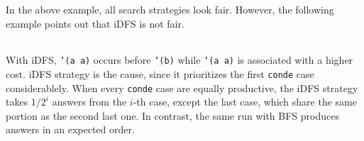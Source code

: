 \documentclass[format=acmlarge, review=true, authordraft=true]{acmart}
\begin{document}

In the above example, all search strategies look fair. However, the following 
example points out that iDFS is not fair.

\begin{center}
  \begin{tabular}{c}
   
   \end{tabular}
\end{center}

With iDFS, \texttt{'(a a)} occurs before \texttt{'(b)} while \texttt{'(a a)} is 
associated with a higher cost. iDFS strategy is the cause, since it prioritizes 
the first \texttt{conde} case considerablely. When every \texttt{conde} case 
are equally productive, the iDFS strategy takes $1/2^{i}$ answers from the 
$i$-th case, except the last case, which share the same portion as the second 
last one. In contrast, the same run with BFS produces answers in an expected 
order.

\begin{center}
  \begin{tabular}{c}
   
   \end{tabular}
\end{center}
\end{document}
